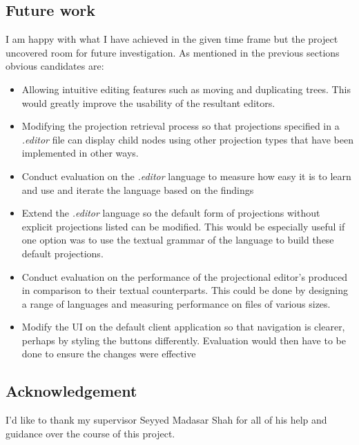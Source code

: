 \documentclass{article}
\begin{document}
\subsection{Future work}\label{futureWork}
I am happy with what I have achieved in the given time frame but the project uncovered room for future investigation. As mentioned in the previous sections obvious candidates are:
\begin{itemize}
\item Allowing intuitive editing features such as moving and duplicating trees. This would greatly improve the usability of the resultant editors. 
\item Modifying the projection retrieval process so that projections specified in a \emph{.editor} file can display child nodes using other projection types that have been implemented in other ways.
\item Conduct evaluation on the \emph{.editor} language to measure how easy it is to learn and use and iterate the language based on the findings
\item Extend the \emph{.editor} language so the default form of projections without explicit projections listed can be modified. This would be especially useful if one option was to use the textual grammar of the language to build these default projections.
\item Conduct evaluation on the performance of the projectional editor's produced in comparison to their textual counterparts. This could be done by designing a range of languages and measuring performance on files of various sizes.
\item Modify the UI on the default client application so that navigation is clearer, perhaps by styling the buttons differently. Evaluation would then have to be done to ensure the changes were effective
\end{itemize}
\subsection{Acknowledgement}
I'd like to thank my supervisor Seyyed Madasar Shah for all of his help and guidance over the course of this project.
\clearpage

\printbibliography

%
\end{document}
